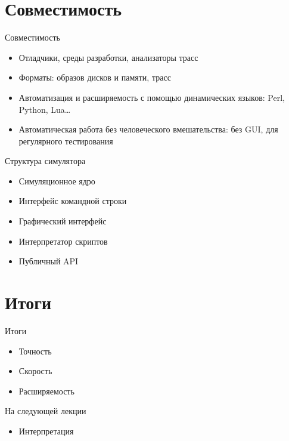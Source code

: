 \section{Совместимость}

\begin{frame}{Совместимость}
\begin{itemize}
\item Отладчики, среды разработки, анализаторы трасс
\item Форматы: образов дисков и памяти, трасс
\item Автоматизация и расширяемость с помощью динамических языков: Perl, Python, Lua\dots
\item Автоматическая работа без человеческого вмешательства: без GUI, для регулярного тестирования
\end{itemize}
\end{frame}

\begin{frame}{Структура симулятора}
\begin{itemize}
\item Симуляционное ядро
\item Интерфейс командной строки
\item Графический интерфейс
\item Интерпретатор скриптов
\item Публичный API
\end{itemize}
\end{frame}

\section{Итоги}

\begin{frame}{Итоги}
\begin{itemize}
\item Точность
\item Скорость
\item Расширяемость
\end{itemize}
\end{frame}

\begin{frame}{На следующей лекции}
\begin{itemize}
\item Интерпретация
\end{itemize}
\end{frame}


